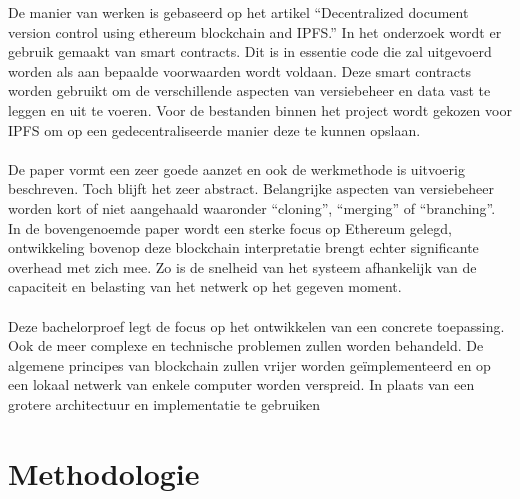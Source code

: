 De manier van werken is gebaseerd op het artikel “Decentralized document version control using ethereum blockchain and IPFS.” \autocite{Nizamuddin2019} In het onderzoek wordt er gebruik gemaakt van smart contracts. Dit is in essentie code die zal uitgevoerd worden als aan bepaalde voorwaarden wordt voldaan. Deze smart contracts worden gebruikt om de verschillende aspecten van versiebeheer en data vast te leggen en uit te voeren. Voor de bestanden binnen het project wordt gekozen voor IPFS om op een gedecentraliseerde manier deze te kunnen opslaan. \\\\
De paper vormt een zeer goede aanzet en ook de werkmethode is uitvoerig beschreven. Toch blijft het zeer abstract. Belangrijke aspecten van versiebeheer worden kort of niet aangehaald waaronder “cloning”, “merging” of “branching”. In de bovengenoemde paper wordt een sterke focus op Ethereum gelegd, ontwikkeling bovenop deze blockchain interpretatie brengt echter significante overhead met zich mee. Zo is de snelheid van het systeem afhankelijk van de capaciteit en belasting van het netwerk op het gegeven moment.\\\\
Deze bachelorproef legt de focus op het ontwikkelen van een concrete toepassing. Ook de meer complexe en technische problemen zullen worden behandeld. De algemene principes van blockchain zullen vrijer worden geïmplementeerd en op een lokaal netwerk van enkele computer worden verspreid. In plaats van een grotere architectuur en implementatie te gebruiken


\section{Methodologie}
\label{sec:methodologie}

